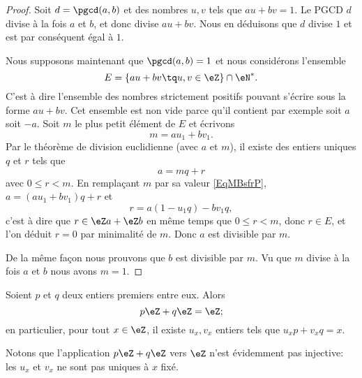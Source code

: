 \begin{proof}
    Soit \( d=\pgcd(a,b)\) et des nombres \( u,v\) tels que \( au+bv=1\). Le PGCD \( d\) divise à la fois \( a\) et \( b\), et donc divise \( au+bv\). Nous en déduisons que \( d\) divise \( 1\) et est par conséquent égal à \( 1\).

    Nous supposons maintenant que \( \pgcd(a,b)=1\) et nous considérons l'ensemble
    \begin{equation}
        E=\{ au+bv\tq u,v\in \eZ \}\cap \eN^*.
    \end{equation}
    C'est à dire l'ensemble des nombres strictement positifs pouvant s'écrire sous la forme \( au+bv\). Cet ensemble est non vide parce qu'il contient par exemple soit \( a\) soit \( -a\). Soit \( m\) le plus petit élément de \( E\) et écrivons
    \begin{equation}    \label{EqMBsfrP}
        m=au_1+bv_1.
    \end{equation}
    Par le théorème de division euclidienne (avec \( a\) et \( m\)), il existe des entiers uniques $q$ et $r$ tels que
    \begin{equation}
        a=mq+r
    \end{equation}
    avec \( 0\leq r<m\). En remplaçant \( m\) par sa valeur \eqref{EqMBsfrP}, \( a=(au_1+bv_1)q+r\) et 
    \begin{equation}
        r=a(1-u_1q)-bv_1q,
    \end{equation}
    c'est à dire que \( r\in \eZ a+\eZ b\) en même temps que \( 0\leq r<m\), donc \(r \in E \), et l'on déduit \( r=0\) par minimalité de \( m\). Donc \( a\) est divisible par \( m\). 

    De la même façon nous prouvons que \( b\) est divisible par \( m\). Vu que \( m\) divise à la fois \( a\) et \( b\) nous avons \( m=1\).
\end{proof}

\begin{corollary}       \label{CorgEMtLj}
    Soient \( p\) et \( q\) deux entiers premiers entre eux. Alors
    \begin{equation}
        p\eZ+q\eZ=\eZ;
    \end{equation}
    en particulier, pour tout \( x \in \eZ \), il existe \( u_x, v_x \) entiers tels que \(u_x p + v_x q = x \).
\end{corollary}

Notons que l'application \( p\eZ+q\eZ\) vers \( \eZ\) n'est évidemment pas injective: les $u_x$ et $v_x$ ne sont pas uniques à $x$ fixé.

